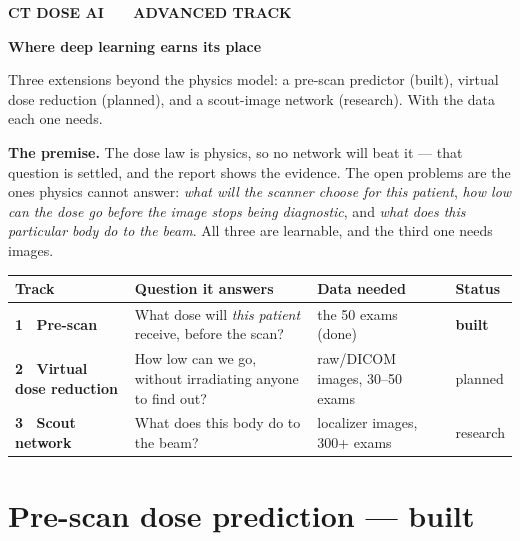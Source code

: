 \documentclass[10pt,a4paper]{article}
\newcommand{\hdr}{\rowcolor{ctsurf}}
\begin{document}
\thispagestyle{empty}

\vspace*{4mm}
{\footnotesize\bfseries\color{ctblue}\MakeUppercase{CT Dose AI \ \textperiodcentered\ \ Advanced track}}

\vspace{3mm}
{\fontsize{24}{28}\selectfont\bfseries Where deep learning earns its place}

\vspace{3mm}
{\large\color{ctink2}Three extensions beyond the physics model: a pre-scan predictor (built), virtual dose
reduction (planned), and a scout-image network (research). With the data each one needs.\par}

\vspace{6mm}
\begin{callout}
\textbf{The premise.} The dose law is physics, so no network will beat it --- that question is settled, and the
report shows the evidence. The open problems are the ones physics cannot answer: \textit{what will the scanner
choose for this patient}, \textit{how low can the dose go before the image stops being diagnostic}, and
\textit{what does this particular body do to the beam}. All three are learnable, and the third one needs images.
\end{callout}

\vspace{2mm}
\noindent\begin{tabularx}{\linewidth}{@{}l L l l@{}}
\toprule
\hdr \textbf{Track} & \textbf{Question it answers} & \textbf{Data needed} & \textbf{Status}\\
\midrule
\textbf{1 \ Pre-scan} & What dose will \textit{this patient} receive, before the scan? & the 50 exams (done) & \textcolor{ctaqua}{\textbf{built}}\\
\textbf{2 \ Virtual dose reduction} & How low can we go, without irradiating anyone to find out? & raw/DICOM images, 30--50 exams & planned\\
\textbf{3 \ Scout network} & What does this body do to the beam? & localizer images, 300+ exams & research\\
\bottomrule
\end{tabularx}

\section{Pre-scan dose prediction --- built}
\end{document}
